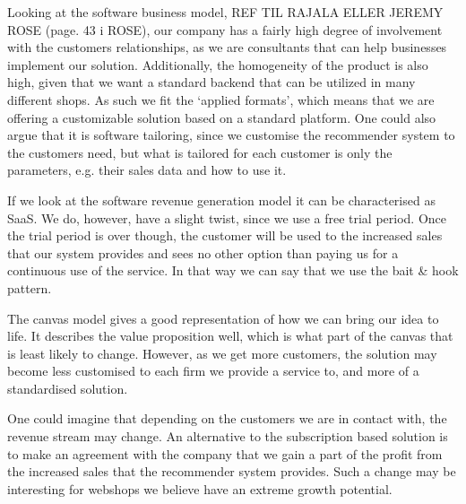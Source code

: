 Looking at the software business model, REF TIL RAJALA ELLER JEREMY ROSE (page. 43 i ROSE), our company has a fairly high degree of involvement with the customers relationships, as we are consultants that can help businesses implement our solution. 
Additionally, the homogeneity of the product is also high, given that we want a standard backend that can be utilized in many different shops. 
As such we fit the ‘applied formats’, which means that we are offering a customizable solution based on a standard platform. One could also argue that it is software tailoring, since we customise the recommender system to the customers need, but what is tailored for each customer is only the parameters, e.g. their sales data and how to use it.

If we look at the software revenue generation model it can be characterised as SaaS.
We do, however, have a slight twist, since we use a free trial period.
Once the trial period is over though, the customer will be used to the increased sales that our system provides and sees no other option than paying us for a continuous use of the service.
In that way we can say that we use the bait \& hook pattern.


The canvas model gives a good representation of how we can bring our idea to life.
It describes the value proposition well, which is what part of the canvas that is least likely to change. 
However, as we get more customers, the solution may become less customised to each firm we provide a service to, and more of a standardised solution.

One could imagine that depending on the customers we are in contact with, the revenue stream may change. 
An alternative to the subscription based solution is to make an agreement with the company that we gain a part of the profit from the increased sales that the recommender system provides.
Such a change may be interesting for webshops we believe have an extreme growth potential.

